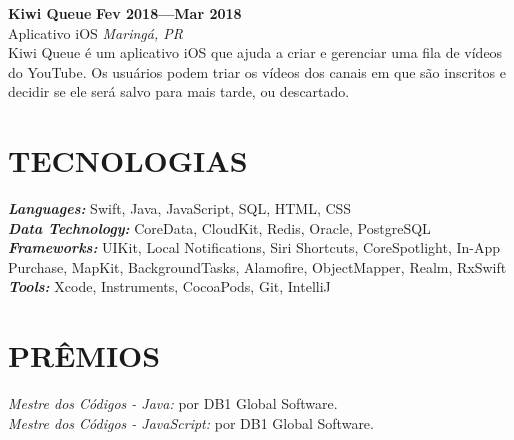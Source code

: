 \documentclass[line,margin]{res}
\begin{document}
\begin{resume}
  {\bf Kiwi Queue} \hfill {\bf Fev 2018---Mar 2018} \\
  Aplicativo iOS \hfill {\sl Maring\'a, PR}\\[6pt]
  Kiwi Queue é um aplicativo iOS que ajuda a criar e gerenciar uma fila de vídeos do YouTube. Os usuários podem triar os vídeos dos canais em que são inscritos e decidir se ele será salvo para mais tarde, ou descartado.


\section{TECNOLOGIAS}
  {\sl {\bf Languages:}} Swift, Java, JavaScript, SQL, HTML, CSS \\
  {\sl {\bf Data Technology:}} CoreData, CloudKit, Redis, Oracle, PostgreSQL \\
  {\sl {\bf Frameworks:}} UIKit, Local Notifications, Siri Shortcuts, CoreSpotlight, In-App Purchase, MapKit, BackgroundTasks, Alamofire, ObjectMapper, Realm, RxSwift \\
  {\sl {\bf Tools:}} Xcode, Instruments, CocoaPods, Git, IntelliJ


\section{PRÊMIOS}             
  {\sl Mestre dos C\'odigos - Java:} por DB1 Global Software.\\
  {\sl Mestre dos C\'odigos - JavaScript:} por DB1 Global Software.\\
 

\end{resume}
\end{document}
